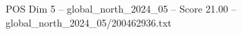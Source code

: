 \begin{textsample}{POS Dim 5 – global\_north\_2024\_05 – Score 21.00 – global\_north\_2024\_05/200462936.txt}
\end{textsample}
